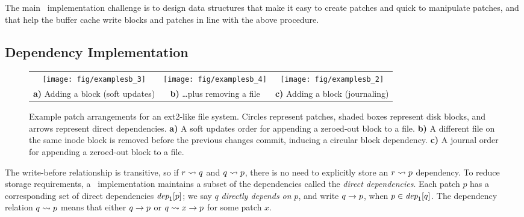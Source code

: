 The main \Featherstitch\ implementation challenge is to design
 data structures that make it easy to create patches and quick to manipulate
 patches, and that help the buffer cache write blocks and patches in line
 with the above procedure.


\subsection{Dependency Implementation}



\begin{figure*}[t]
\centering
\begin{tabular}{@{}cc@{\qquad\qquad}c@{}}
\texttt{[image: fig/examplesb\_3]}
& \texttt{[image: fig/examplesb\_4]}
& \texttt{[image: fig/examplesb\_2]} \\
\textbf{a)} Adding a block (soft updates)
& \textbf{b)} \dots plus removing a file
& \textbf{c)} Adding a block (journaling) \\
\end{tabular}
\caption{Example patch arrangements for an ext2-like file system.
 Circles represent patches, shaded boxes represent disk blocks, and arrows
 represent direct dependencies.
 \textbf{a)} A soft updates order for appending a zeroed-out block to
 a file.  \textbf{b)} A different file on the same inode block is removed
 before the previous changes commit, inducing a circular block dependency.
 \textbf{c)} A journal order for appending a zeroed-out block to a
 file.}
\label{f:ex}
\end{figure*}


The write-before relationship is transitive, so if $r \leadsto q$ and $q
 \leadsto p$, there is no need to explicitly store an $r \leadsto p$
 dependency.
%
To reduce storage requirements, a \Kudos\ implementation maintains a
 subset of the dependencies called the \emph{direct dependencies}.
%
Each patch $p$ has a corresponding set of direct dependencies
 $\textit{dep}_1[p]$; 
%
we say $q$ \emph{directly depends on} $p$, and write $q \rightarrow p$, when
 $p \in \textit{dep}_1[q]$.
%
The dependency relation $q \leadsto p$ means that either $q
 \rightarrow p$ or $q \leadsto x \rightarrow p$ for some patch $x$.


\begin{comment}
\paragraph{Undo data}
%
When a \patch\ is created, the buffer cache's copy of the block data
is modified in-place to reflect the change. However,
%
some arrangements of \patches\ may require that the buffer cache
first write a block with only some \patches\ applied, and then write a
different block before being able to write the remaining \patches.
%
(An example of this is given in Section~\ref{sec:patch:examples}.)
\end{comment}



